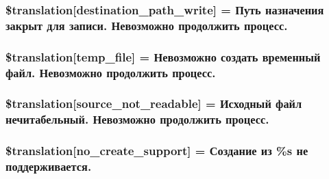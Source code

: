 \subsubsection[{\$translation}]{\setlength{\rightskip}{0pt plus 5cm}\$translation\mbox{[}\textquotesingle{}destination\+\_\+path\+\_\+write\textquotesingle{}\mbox{]} = \textquotesingle{}Путь назначения закрыт для записи. Невозможно продолжить процесс.\textquotesingle{}}\label{class_8upload_8ru___r_u_8php_a40e4e1962226b89fd76da5819a9602b0}
\hypertarget{class_8upload_8ru___r_u_8php_a2baece8da11e20d45175db91851ec3e3}{}
\subsubsection[{\$translation}]{\setlength{\rightskip}{0pt plus 5cm}\$translation\mbox{[}\textquotesingle{}temp\+\_\+file\textquotesingle{}\mbox{]} = \textquotesingle{}Невозможно создать временный файл. Невозможно продолжить процесс.\textquotesingle{}}\label{class_8upload_8ru___r_u_8php_a2baece8da11e20d45175db91851ec3e3}
\hypertarget{class_8upload_8ru___r_u_8php_a922967ca2df0efdd455261142d8e5715}{}
\subsubsection[{\$translation}]{\setlength{\rightskip}{0pt plus 5cm}\$translation\mbox{[}\textquotesingle{}source\+\_\+not\+\_\+readable\textquotesingle{}\mbox{]} = \textquotesingle{}Исходный файл нечитабельный. Невозможно продолжить процесс.\textquotesingle{}}\label{class_8upload_8ru___r_u_8php_a922967ca2df0efdd455261142d8e5715}
\hypertarget{class_8upload_8ru___r_u_8php_a346dfd1ade29f583dd20d345c436859f}{}
\subsubsection[{\$translation}]{\setlength{\rightskip}{0pt plus 5cm}\$translation\mbox{[}\textquotesingle{}no\+\_\+create\+\_\+support\textquotesingle{}\mbox{]} = \textquotesingle{}Создание из \%s не поддерживается.\textquotesingle{}}\label{class_8upload_8ru___r_u_8php_a346dfd1ade29f583dd20d345c436859f}
\hypertarget{class_8upload_8ru___r_u_8php_a53013ce9255c4e1849098ddd9fdb2b3f}{}
